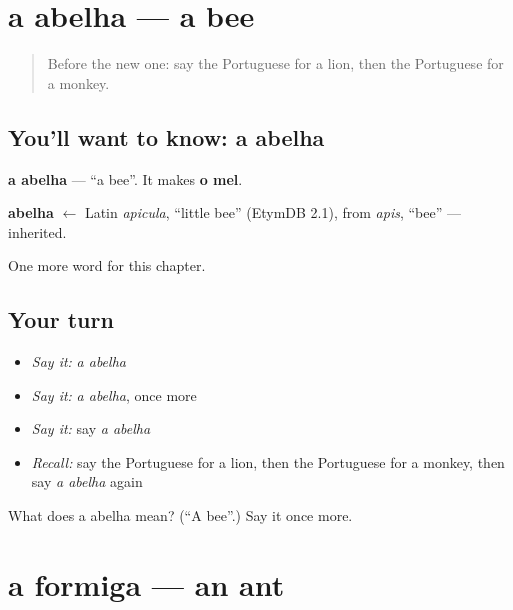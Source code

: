 \section[a abelha]{a abelha — a bee}

\label{lesson:PT-C63-abelha}



\begin{quote}
Before the new one: say the Portuguese for a lion, then the Portuguese for a monkey.
\end{quote}

\subsection*{You'll want to know: a abelha}
\textbf{a abelha} — \textquotedblleft{}a bee\textquotedblright{}. It makes \textbf{o mel}.

\begin{cousinweb}
\textbf{abelha} $\leftarrow$ Latin \emph{apicula}, \textquotedblleft{}little bee\textquotedblright{} (EtymDB 2.1), from \emph{apis}, \textquotedblleft{}bee\textquotedblright{} — inherited.
\end{cousinweb}

\begin{grammarlens}[title={What you've built}]
One more word for this chapter.
\end{grammarlens}

\subsection*{Your turn}
\begin{itemize}
\raggedright
  \item \emph{Say it:} \emph{a abelha}
  \item \emph{Say it:} \emph{a abelha}, once more
  \item \emph{Say it:} say \emph{a abelha}
  \item \emph{Recall:} say the Portuguese for a lion, then the Portuguese for a monkey, then say \emph{a abelha} again
\end{itemize}

\begin{tcolorbox}[breakable,colback=teal!4,colframe=teal!35!black,title={Before you move on}]
What does a abelha mean? (\textquotedblleft{}A bee\textquotedblright{}.) Say it once more.
\end{tcolorbox}
\section[a formiga]{a formiga — an ant}

